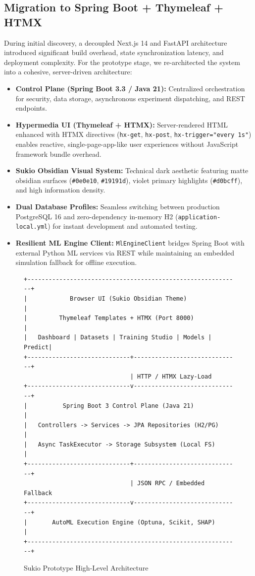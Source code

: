﻿\documentclass[11pt,a4paper]{article}
\begin{document}
\subsection{Migration to Spring Boot + Thymeleaf + HTMX}
During initial discovery, a decoupled Next.js 14 and FastAPI architecture introduced significant build overhead, state synchronization latency, and deployment complexity. For the prototype stage, we re-architected the system into a cohesive, server-driven architecture:
\begin{itemize}[leftmargin=0.7cm]
  \item \textbf{Control Plane (Spring Boot 3.3 / Java 21):} Centralized orchestration for security, data storage, asynchronous experiment dispatching, and REST endpoints.
  \item \textbf{Hypermedia UI (Thymeleaf + HTMX):} Server-rendered HTML enhanced with HTMX directives (\texttt{hx-get}, \texttt{hx-post}, \texttt{hx-trigger="every 1s"}) enables reactive, single-page-app-like user experiences without JavaScript framework bundle overhead.
  \item \textbf{Sukio Obsidian Visual System:} Technical dark aesthetic featuring matte obsidian surfaces (\texttt{\#0e0e10}, \texttt{\#19191d}), violet primary highlights (\texttt{\#d0bcff}), and high information density.
  \item \textbf{Dual Database Profiles:} Seamless switching between production PostgreSQL 16 and zero-dependency in-memory H2 (\texttt{application-local.yml}) for instant development and automated testing.
  \item \textbf{Resilient ML Engine Client:} \texttt{MlEngineClient} bridges Spring Boot with external Python ML services via REST while maintaining an embedded simulation fallback for offline execution.
\end{itemize}

\begin{figure}[H]
\centering
\begin{verbatim}
+------------------------------------------------------------+
|            Browser UI (Sukio Obsidian Theme)               |
|         Thymeleaf Templates + HTMX (Port 8000)             |
|   Dashboard | Datasets | Training Studio | Models | Predict|
+-----------------------------+------------------------------+
                              | HTTP / HTMX Lazy-Load
+-----------------------------v------------------------------+
|          Spring Boot 3 Control Plane (Java 21)             |
|   Controllers -> Services -> JPA Repositories (H2/PG)      |
|   Async TaskExecutor -> Storage Subsystem (Local FS)       |
+-----------------------------+------------------------------+
                              | JSON RPC / Embedded Fallback
+-----------------------------v------------------------------+
|       AutoML Execution Engine (Optuna, Scikit, SHAP)       |
+------------------------------------------------------------+
\end{verbatim}
\caption{Sukio Prototype High-Level Architecture}
\end{figure}
\end{document}
